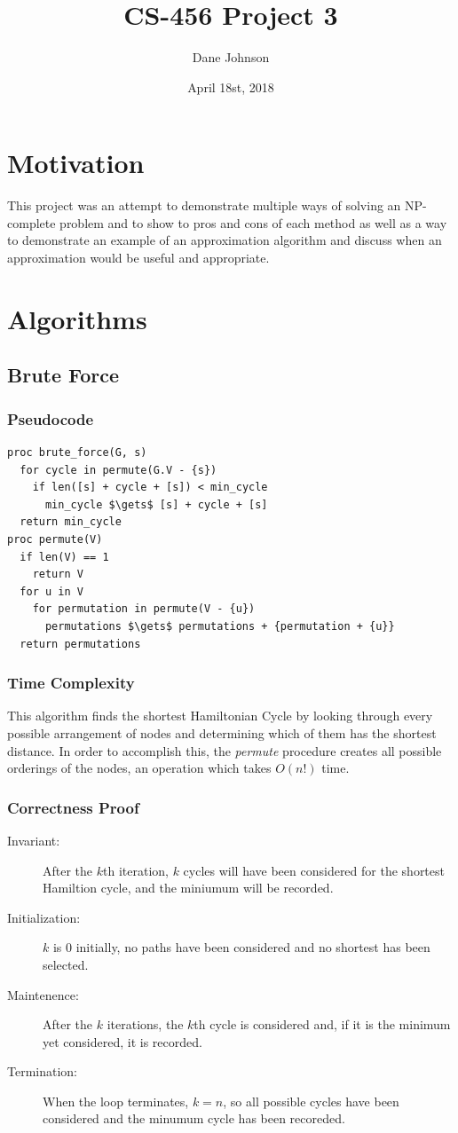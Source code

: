 \documentclass[a4paper,12pt]{article}
\title{CS-456 Project 3}
\author{Dane Johnson}
\date{April 18st, 2018}
\begin{document}
\maketitle
\newpage
\section{Motivation}

This project was an attempt to demonstrate multiple ways of solving an NP-complete problem and to show to pros and cons
of each method as well as a way to demonstrate an example of an approximation algorithm and discuss when an approximation
would be useful and appropriate.

\section{Algorithms}
\subsection{Brute Force}
\subsubsection{Pseudocode}
\begin{lstlisting}[mathescape=true]
proc brute_force(G, s)
  for cycle in permute(G.V - {s})
    if len([s] + cycle + [s]) < min_cycle
      min_cycle $\gets$ [s] + cycle + [s]
  return min_cycle
proc permute(V)
  if len(V) == 1
    return V
  for u in V
    for permutation in permute(V - {u})
      permutations $\gets$ permutations + {permutation + {u}}
  return permutations
\end{lstlisting}
\subsubsection{Time Complexity}
This algorithm finds the shortest Hamiltonian Cycle by looking through every possible arrangement of nodes and determining which of them has the shortest distance. In order to accomplish this, the {\it permute} procedure creates all possible orderings of the nodes, an operation which takes $O(n!)$ time.
\subsubsection{Correctness Proof}
\begin{description}
\item [Invariant: ] After the $k$th iteration, $k$ cycles will have been considered for the shortest Hamiltion cycle, and the miniumum will be recorded.
\item [Initialization: ] $k$ is 0 initially, no paths have been considered and no shortest has been selected.
\item [Maintenence: ] After the $k$ iterations, the $k$th cycle is considered and, if it is the minimum yet considered, it is recorded.
\item [Termination: ] When the loop terminates, $k = n$, so all possible cycles have been considered and the minumum cycle has been recoreded.
\end{description}
\end{document}
